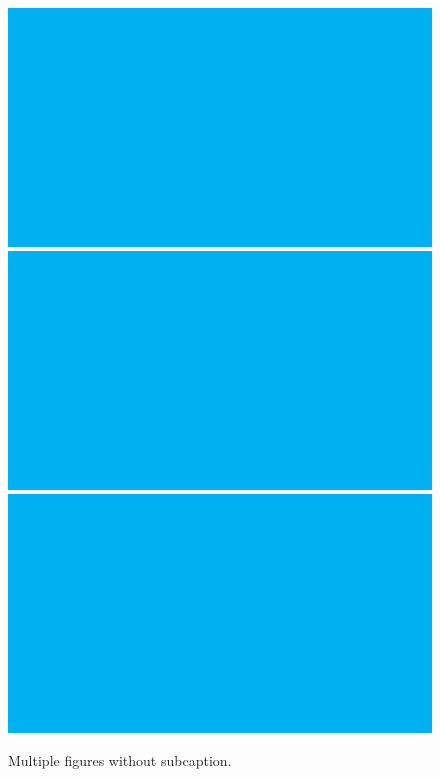 \begin{figure}[h!]
  \centering
  \includegraphics[width=.12\columnwidth]{fig/fig1.pdf}
  \hspace{.1in}
  \includegraphics[width=.3\columnwidth]{fig/fig1.pdf}
  \hspace{.1in}
  \includegraphics[width=.12\columnwidth]{fig/fig1.pdf}
  \caption{Multiple figures without subcaption.}
  \label{fig:multiple}
\end{figure}
